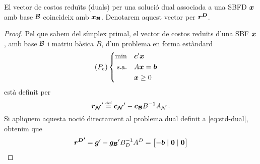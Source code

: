 \begin{prop}
	El vector de costos reduïts (duals) per una solució dual associada a una SBFD $\boldsymbol{x}$ amb base $\mathcal{B}$ coincideix amb $\boldsymbol{x_{\mathcal{B}}}$. Denotarem aquest vector per $\boldsymbol{r^D}$.
	\begin{proof}
		Pel que sabem del símplex primal, el vector de costos reduïts d'una SBF $\boldsymbol{x}$, amb base $\mathcal{B}$ i matriu bàsica $B$, d'un problema en forma estàndard
		\[
			(P_e)
			\begin{cases}
				\begin{aligned}
				\min 			&&& \boldsymbol{c}'\boldsymbol{x}\\
				\text{s.a.}		&&& A\boldsymbol{x} = \boldsymbol{b}\\
				&&& \boldsymbol{x}\ge0
			\end{aligned}
			\end{cases}\
		\]
		està definit per
		\[
			\boldsymbol{r_{\mathcal{N}}}' \stackrel{\text{\tiny def}}{=} \boldsymbol{c_{\mathcal{N}}}' - \boldsymbol{c_{\mathcal{B}}}B^{-1}A_{\mathcal{N}}\,.
		\]
		Si apliquem aquesta noció directament al problema dual definit a \eqref{eq:std-dual}, obtenim que
		\begin{multline*}
			\boldsymbol{r^D}' = \boldsymbol{g}' - \boldsymbol{g_{\mathcal{B}}}'B_D^{-1}A^D = \left[-\boldsymbol{b} \;|\; \boldsymbol{0} \;|\; \boldsymbol{0} \right]
		\end{multline*}
	\end{proof}
\end{prop}

